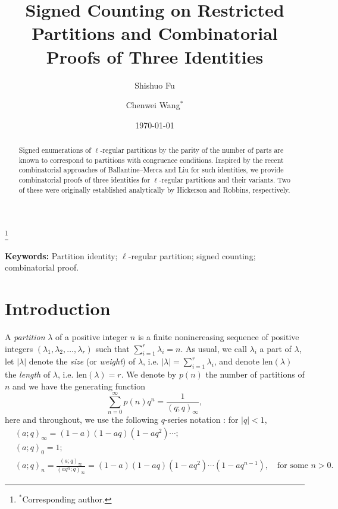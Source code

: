 \documentclass[12pt,reqno]{amsart}
\numberwithin{equation}{section}
\newcommand{\len}{\mathrm{len}}
\begin{document}
\title[Signed counting and combinatorial proofs]{Signed Counting on Restricted Partitions and Combinatorial Proofs of Three Identities}

\author[S. Fu]{Shishuo Fu}
\address[Shishuo Fu]{College of Mathematics and Statistics \& Center for Discrete Mathematics, Chongqing University, Chongqing 401331, China}
\author[C. Wang]{Chenwei Wang$^{\ast}$}
\address[Chenwei Wang]{College of Mathematics and Statistics, Chongqing University, Chongqing 401331, China}
\thanks{$^{\ast}$Corresponding author.}

\date{\today}

	
	
	
	\begin{abstract}
	Signed enumerations of $\ell$-regular partitions by the parity of the number of parts are known to correspond to partitions with congruence conditions. Inspired by the recent combinatorial approaches of Ballantine–Merca and Liu for such identities, we provide combinatorial proofs of three identities for $\ell$-regular partitions and their variants. Two of these were originally established analytically by Hickerson and Robbins, respectively.
	\end{abstract}
	\maketitle 
    \noindent \textbf{Keywords:} Partition identity; $\ell$-regular partition; signed counting; combinatorial proof.
	
		
	
	\section{Introduction}
	A \textit{partition} $\lambda$ of a positive integer $n$ is a finite nonincreasing sequence of positive integers $(\lambda_1, \lambda_2, \ldots, \lambda_r)$ such that $\sum_{i=1}^r \lambda_i = n$. As usual, we call $\lambda_i$ a part of $\lambda$, let $|\lambda|$ denote the \textit{size} (or \emph{weight}) of $\lambda$, i.e. $|\lambda| =\sum_{i=1}^r \lambda_i$, and denote $\len(\lambda)$ the \textit{length} of $\lambda$, i.e. $\len(\lambda) = r$. We denote by $p(n)$ the number of partitions of $n$ and we have the generating function
	\begin{equation}
		\sum_{n=0}^{\infty} p(n)q^n = \frac{1}{(q;q)_\infty} ,
	\end{equation}
	here and throughout, we use the following $q$-series notation \cite[Section 2.2]{andrews1998}: for $|q|<1$,
	\begin{align*}
		&(a;q)_{\infty}=(1-a)(1-aq)(1-aq^{2})\cdots ;\\
		&(a;q)_{0}=1;\\
		&(a;q)_{n}=\frac{(a;q)_{\infty}}{(aq^{n};q)_{\infty}}=(1-a)(1-aq)(1-aq^{2})\cdots(1-aq^{n-1}) ,\quad \text{for some } n > 0.
	\end{align*}
	
\end{document}
